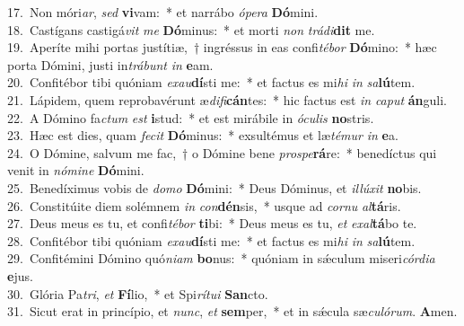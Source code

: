 {17.~}Non móri\textit{ar}, \textit{sed} \textbf{vi}vam:~* et narrábo \textit{ó}\textit{pe}\textit{ra} \textbf{Dó}mini.\\
{18.~}Castígans castigá\textit{vit} \textit{me} \textbf{Dó}minus:~* et morti \textit{non} \textit{trá}\textit{di}\textbf{dit} me.\\
{19.~}Aperíte mihi portas justítiæ,~† ingréssus in eas confi\textit{té}\textit{bor} \textbf{Dó}mino:~* hæc porta Dómini, justi in\textit{trá}\textit{bunt} \textit{in} \textbf{e}am.\\
{20.~}Confitébor tibi quóniam \textit{e}\textit{xau}\textbf{dí}sti me:~* et factus es mi\textit{hi} \textit{in} \textit{sa}\textbf{lú}tem.\\
{21.~}Lápidem, quem reprobavérunt æ\textit{di}\textit{fi}\textbf{cán}tes:~* hic factus est \textit{in} \textit{ca}\textit{put} \textbf{án}guli.\\
{22.~}A Dómino fa\textit{ctum} \textit{est} \textbf{i}stud:~* et est mirábile in \textit{ó}\textit{cu}\textit{lis} \textbf{no}stris.\\
{23.~}Hæc est dies, quam \textit{fe}\textit{cit} \textbf{Dó}minus:~* exsultémus et læ\textit{té}\textit{mur} \textit{in} \textbf{e}a.\\
{24.~}O Dómine, salvum me fac,~† o Dómine bene \textit{pro}\textit{spe}\textbf{rá}re:~* benedíctus qui venit in \textit{nó}\textit{mi}\textit{ne} \textbf{Dó}mini.\\
{25.~}Benedíximus vobis de \textit{do}\textit{mo} \textbf{Dó}mini:~* Deus Dóminus, et \textit{il}\textit{lú}\textit{xit} \textbf{no}bis.\\
{26.~}Constitúite diem solémnem \textit{in} \textit{con}\textbf{dén}sis,~* usque ad \textit{cor}\textit{nu} \textit{al}\textbf{tá}ris.\\
{27.~}Deus meus es tu, et confi\textit{té}\textit{bor} \textbf{ti}bi:~* Deus meus es tu, \textit{et} \textit{e}\textit{xal}\textbf{tá}bo te.\\
{28.~}Confitébor tibi quóniam \textit{e}\textit{xau}\textbf{dí}sti me:~* et factus es mi\textit{hi} \textit{in} \textit{sa}\textbf{lú}tem.\\
{29.~}Confitémini Dómino quó\textit{ni}\textit{am} \textbf{bo}nus:~* quóniam in sǽculum miseri\textit{cór}\textit{di}\textit{a} \textbf{e}jus.\\
{30.~}Glória Pa\textit{tri}, \textit{et} \textbf{Fí}lio,~* et Spi\textit{rí}\textit{tu}\textit{i} \textbf{San}cto.\\
{31.~}Sicut erat in princípio, et \textit{nunc}, \textit{et} \textbf{sem}per,~* et in sǽcula sæ\textit{cu}\textit{ló}\textit{rum}. \textbf{A}men.\\
